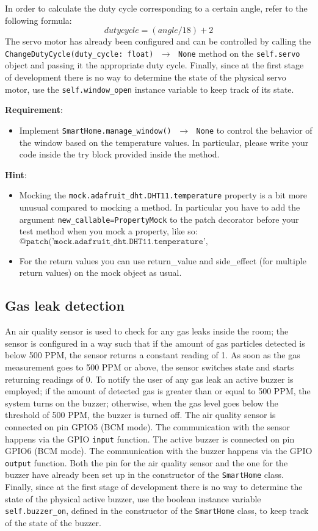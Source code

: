 In order to calculate the duty cycle corresponding to a certain angle, refer to the following formula:
\[
    duty cycle = (angle / 18) + 2
\]
The servo motor has already been configured and can be controlled by calling the \texttt{ChangeDutyCycle(duty\_cycle: float) $\,\to\,$ None} method on the \texttt{self.servo} object and passing it the appropriate duty cycle.
Finally, since at the first stage of development there is no way to determine the state of the physical servo motor, use the \texttt{self.window\_open} instance variable to keep track of its state.

\noindent\textbf{Requirement}:
\begin{itemize}
    \item Implement \texttt{SmartHome.manage\_window() $\,\to\,$ None} to control the behavior of the window based on the temperature values. In particular, please write your code inside the try block provided inside the method.
\end{itemize}

\noindent\textbf{Hint}:
\begin{itemize}
    \item Mocking the \texttt{mock.adafruit\_dht.DHT11.temperature} property is a bit more unusual compared to mocking a method. In particular you have to add the argument \texttt{new\_callable=PropertyMock} to the patch decorator before your test method when you mock a property, like so:
    \[
        \texttt{@patch('mock.adafruit\_dht.DHT11.temperature', new\_callable=PropertyMock)}
    \]
    \item For the return values you can use return\_value and side\_effect (for multiple return values) on the mock object as usual.
\end{itemize}


\subsection{Gas leak detection}
An air quality sensor is used to check for any gas leaks inside the room; the sensor is configured in a way such that if the amount of gas particles detected is below 500 PPM, the sensor returns a constant reading of 1. As soon as the gas measurement goes to 500 PPM or above, the sensor switches state and starts returning readings of 0.
To notify the user of any gas leak an active buzzer is employed; if the amount of detected gas is greater than or equal to 500 PPM, the system turns on the buzzer; otherwise, when the gas level goes below the threshold of 500 PPM, the buzzer is turned off.
The air quality sensor is connected on pin GPIO5 (BCM mode). The communication with the sensor happens via the GPIO \texttt{input} function. 
The active buzzer is connected on pin GPIO6 (BCM mode). The communication with the buzzer happens via the GPIO \texttt{output} function.
Both the pin for the air quality sensor and the one for the buzzer  have already been set up in the constructor of the \texttt{SmartHome} class. 
Finally, since at the first stage of development there is no way to determine the state of the physical active buzzer, use the boolean instance variable \texttt{self.buzzer\_on}, defined in the constructor of the \texttt{SmartHome} class, to keep track of the state of the buzzer.

